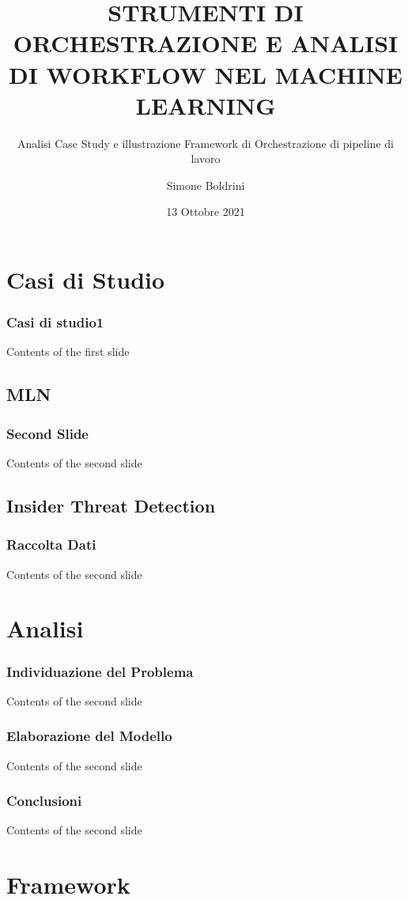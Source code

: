 \documentclass[xcolor=dvipsnames]{beamer}
\title{STRUMENTI DI ORCHESTRAZIONE E ANALISI DI WORKFLOW NEL MACHINE LEARNING}
\subtitle[]{Analisi Case Study e illustrazione Framework di Orchestrazione di pipeline di lavoro}
\author{Simone Boldrini}
\date{13 Ottobre 2021}
\institute[Unibo]{Alma Mater Studiorum - Universitá di Bologna \\ Facoltá di Scienze}
\begin{document}
\maketitle

\section{Casi di Studio}
\begin{frame}
    
\frametitle{Casi di studio1}
Contents of the first slide
\end{frame}
\subsection{MLN}
\begin{frame}
\frametitle{Second Slide}
Contents of the second slide
\end{frame}
\subsection{Insider Threat Detection}
\begin{frame}
    \frametitle{Raccolta Dati}
    Contents of the second slide
\end{frame}
\section{Analisi}
\begin{frame}
    \frametitle{Individuazione del Problema}
    Contents of the second slide
\end{frame}
\begin{frame}
    \frametitle{Elaborazione del Modello}
    Contents of the second slide
\end{frame}
\begin{frame}
    \frametitle{Conclusioni}
    Contents of the second slide
\end{frame}
\section{Framework}
\end{document}
